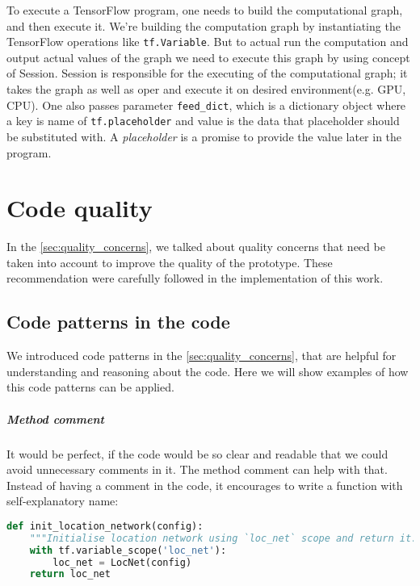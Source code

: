 To execute a TensorFlow program, one needs to build the computational graph,
and then execute it. We're building
the computation graph by instantiating the TensorFlow operations like
\lstinline{tf.Variable}. But to actual run the computation and output actual values
of the graph we need to execute this graph by using concept of Session. Session is
responsible for the executing of the computational graph; it takes the graph
as well as oper
and execute it on desired environment(e.g. GPU, CPU). One also passes parameter
\lstinline{feed_dict}, which is a dictionary object where a key is name of
\lstinline{tf.placeholder} and value is the data that placeholder should be substituted
with. A \emph{placeholder} is a promise to provide the value later in the program.


%

\section{Code quality}
In the \autoref{sec:quality_concerns}, we talked about quality concerns
that need be taken into account to improve the quality of the prototype.
These recommendation were carefully followed in the implementation of this work.

\subsection{Code patterns in the code} We introduced code patterns in the
\autoref{sec:quality_concerns}, that are
helpful for understanding and reasoning about the code. Here we will show
examples of how this code patterns can be applied.

\subparagraph{Method comment} It would be perfect, if the code would
be so clear and readable that we could avoid unnecessary comments in it.
The method comment can help with that. Instead of having a comment in the code,
it encourages to write a function with self-explanatory name:
\begin{lstlisting}[language=Python, caption={Method comment example},label={list:method_comment}]
def init_location_network(config):
    """Initialise location network using `loc_net` scope and return it."""
    with tf.variable_scope('loc_net'):
        loc_net = LocNet(config)
    return loc_net
\end{lstlisting}

